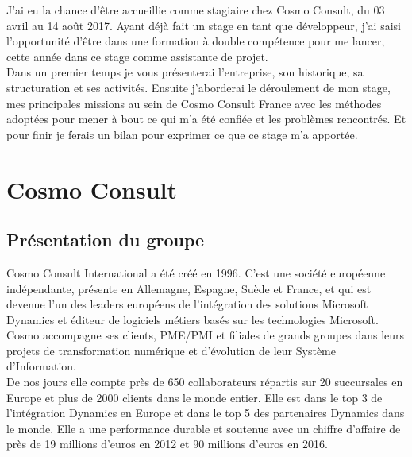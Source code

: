 \documentclass[11pt]{report}
\begin{document}
\hspace{1cm} J'ai eu la chance d'être accueillie comme stagiaire chez Cosmo Consult, du 03 avril au 14 août 2017. Ayant déjà fait un stage en tant que développeur, j'ai saisi l'opportunité d'être dans une formation à double compétence pour me lancer, cette année dans ce stage comme assistante de projet.\\ 
 
\hspace{1cm} Dans un premier temps je vous présenterai l'entreprise, son historique, sa structuration et ses activités. Ensuite j'aborderai le déroulement de mon stage, mes principales missions au sein de Cosmo Consult France avec les méthodes adoptées pour mener à bout ce qui m'a été confiée et les problèmes rencontrés. Et pour finir je ferais un bilan pour exprimer ce que ce stage m'a apportée.

\newpage
\section{Cosmo Consult}
	\subsection{Présentation du groupe}
\hspace{1cm} Cosmo Consult International a été créé en 1996. C'est une société européenne indépendante, présente en Allemagne, Espagne, Suède et France, et qui est devenue l'un des leaders européens de l’intégration des solutions Microsoft Dynamics et éditeur de logiciels métiers basés sur les technologies Microsoft.  Cosmo accompagne ses clients, PME/PMI et filiales de grands groupes dans leurs projets de transformation numérique et d’évolution de leur Système d’Information.\\

\hspace{1cm} De nos jours elle compte près de 650 collaborateurs répartis sur 20 succursales en Europe et plus de 2000 clients dans le monde entier. Elle est dans le top 3 de l'intégration Dynamics en Europe et dans le top 5 des partenaires Dynamics dans le monde. Elle a une performance durable et soutenue avec un chiffre d'affaire de près de 19 millions d'euros en 2012 et 90 millions d'euros en 2016. 
\end{document}
